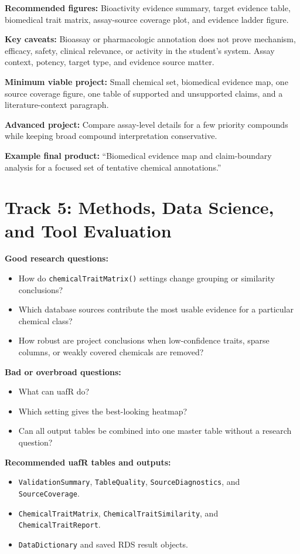 \textbf{Recommended figures:} Bioactivity evidence summary, target evidence table, biomedical trait matrix, assay-source coverage plot, and evidence ladder figure.

\textbf{Key caveats:} Bioassay or pharmacologic annotation does not prove mechanism, efficacy, safety, clinical relevance, or activity in the student's system. Assay context, potency, target type, and evidence source matter.

\textbf{Minimum viable project:} Small chemical set, biomedical evidence map, one source coverage figure, one table of supported and unsupported claims, and a literature-context paragraph.

\textbf{Advanced project:} Compare assay-level details for a few priority compounds while keeping broad compound interpretation conservative.

\textbf{Example final product:} ``Biomedical evidence map and claim-boundary analysis for a focused set of tentative chemical annotations.''

\section{Track 5: Methods, Data Science, and Tool Evaluation}
\textbf{Good research questions:}
\begin{itemize}
  \item How do \texttt{chemicalTraitMatrix()} settings change grouping or similarity conclusions?
  \item Which database sources contribute the most usable evidence for a particular chemical class?
  \item How robust are project conclusions when low-confidence traits, sparse columns, or weakly covered chemicals are removed?
\end{itemize}

\textbf{Bad or overbroad questions:}
\begin{itemize}
  \item What can uafR do?
  \item Which setting gives the best-looking heatmap?
  \item Can all output tables be combined into one master table without a research question?
\end{itemize}

\textbf{Recommended uafR tables and outputs:}
\begin{itemize}
  \item \texttt{ValidationSummary}, \texttt{TableQuality}, \texttt{SourceDiagnostics}, and \texttt{SourceCoverage}.
  \item \texttt{ChemicalTraitMatrix}, \texttt{ChemicalTraitSimilarity}, and \texttt{ChemicalTraitReport}.
  \item \texttt{DataDictionary} and saved RDS result objects.
\end{itemize}

